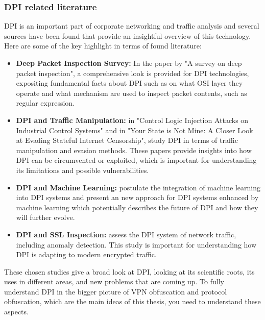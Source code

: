 \documentclass[12pt, fleqn, a4paper]{article}
\begin{document}
\subsubsection{DPI related literature}
DPI is an important part of corporate networking and traffic analysis and several sources have been found that provide an insightful overview of this technology. Here are some of the key highlight in terms of found literature:
\begin{itemize}
  \item \textbf{Deep Packet Inspection Survey:} In the paper by \cite{DPL} "A survey on deep packet inspection", a comprehensive look is provided for DPI technologies, expositing fundamental facts about DPI such as on what OSI layer they operate and what mechanism are used to inspect packet contents, such as regular expression.
  \item \textbf{DPI and Traffic Manipulation:} \cite{dpifragmentation} in "Control Logic Injection Attacks on Industrial Control Systems" and \cite{tcpevasion} in "Your State is Not Mine: A Closer Look at Evading Stateful Internet Censorship", study DPI in terms of traffic manipulation and evasion methods. These papers provide insights into how DPI can be circumvented or exploited, which is important for understanding its limitations and possible vulnerabilities.
  \item \textbf{DPI and Machine Learning:} \cite{dpiml} postulate the integration of machine learning into DPI systems and present an new approach for DPI systems enhanced by machine learning which potentially describes the future of DPI and how they will further evolve.
  \item \textbf{DPI and SSL Inspection:} \cite{dpiprobing} assess the DPI system of network traffic, including anomaly detection. This study is important for understanding how DPI is adapting to modern encrypted traffic.
\end{itemize}
These chosen studies give a broad look at DPI, looking at its scientific roots, its uses in different areas, and new problems that are coming up. To fully understand DPI in the bigger picture of VPN obfuscation and protocol obfuscation, which are the main ideas of this thesis, you need to understand these aspects.
\end{document}
